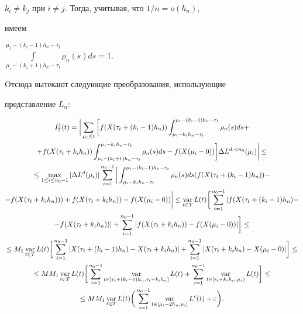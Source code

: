 $k_i \neq k_j$ при $i \neq j$. Тогда, учитывая, что $1/n=o(h_n)$,


имеем


$\int\limits_{\mu_i-(k_i+1)h_n-\tau_t}^{\mu_i-(k_i-1)h_n-\tau_t}


\rho_n(s)ds=1$.


Oтсюда вытекают следующие преобразования, использующие


представление $L_n$:


\begin{gather*}


I_7^1(t)=\bigg|\sum_{\mu_i \leq t}\bigg[f(X(\tau_t+(k_i-1)h_n))


\int_{\mu_i-k_ih_n-\tau_t}^{\mu_i-(k_i-1)h_n-\tau_t}\rho_n(s)ds+\\


+f(X(\tau_t+k_ih_n))


\int_{\mu_i-(k_i+1)h_n-\tau_t}^{\mu_i-k_ih_n-\tau_t}\rho_n(s)ds


- f(X(\mu_i-0)) \bigg] \Delta L^{d,<n_0}(\mu_i)\bigg| \leq\\


\le\max_{1\leq i\leq n_0-1}|\Delta L^{d}(\mu_i)|


\sum_{i=1}^{n_0-1}\bigg|


\int_{\mu_i-k_ih_n-\tau_t}^{\mu_i-(k_i-1)h_n-\tau_t}\rho_n(s)ds


(f(X(\tau_t+(k_i-1)h_n))-\\


-f(X(\tau_t+k_ih_n)))+


f(X(\tau_t+k_ih_n))- f(X(\mu_i-0))\bigg|\leq


\var_{t\in T} L(t)\bigg[\sum_{i=1}^{n_0-1}|


f(X(\tau_t+(k_i-1)h_n)-\\


-f(X(\tau_t+k_ih_n))|+


\sum_{i=1}^{n_0-1} |f(X(\tau_t+k_ih_n))-


f(X(\mu_i-0))|\bigg] \leq\\


\le M_1\var_{t\in T} L(t)


\bigg[\sum_{i=1}^{n_0-1}| X(\tau_t+(k_i-1)h_n)-


X(\tau_t+k_ih_n)|+ \sum_{i=1}^{n_0-1}| X(\tau_t+k_ih_n)-


X(\mu_i-0)|\bigg] \leq\\


\le MM_1\var_{t\in T} L(t)


\bigg[\sum_{i=1}^{n_0-1}\var_{t\in[\tau_t+(k_i-1)h_n,\tau_t+k_ih_n]}


L(t)+\sum_{i=1}^{n_0-1}\var_{t\in[\tau_t+k_ih_n,\mu_i)}


L(t)\bigg]\leq\\ \le


MM_1 \var_{t\in T} L(t)\bigg(\sum_{i=1}^{n_0-1}\var_{t\in[\mu_i-2h_n,\mu_i]}


L^c(t)+\varepsilon\bigg).


\end{gather*}


